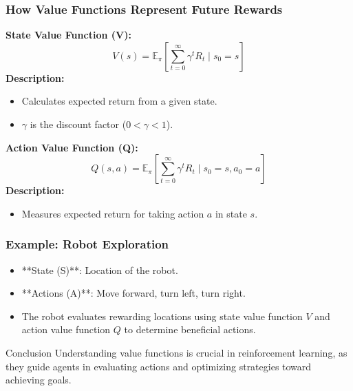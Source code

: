 \documentclass[aspectratio=169]{beamer}
\begin{document}
\begin{frame}[fragile]
    \frametitle{How Value Functions Represent Future Rewards}
    \textbf{State Value Function (V):}
    \begin{equation}
    V(s) = \mathbb{E}_\pi \left[ \sum_{t=0}^{\infty} \gamma^t R_t \mid s_0 = s \right]
    \end{equation}
    \textbf{Description:}
    \begin{itemize}
        \item Calculates expected return from a given state.
        \item \( \gamma \) is the discount factor ($0 < \gamma < 1$).
    \end{itemize}

    \textbf{Action Value Function (Q):}
    \begin{equation}
    Q(s, a) = \mathbb{E}_\pi \left[ \sum_{t=0}^{\infty} \gamma^t R_t \mid s_0 = s, a_0 = a \right]
    \end{equation}
    \textbf{Description:}
    \begin{itemize}
        \item Measures expected return for taking action \( a \) in state \( s \).
    \end{itemize}
\end{frame}

\begin{frame}[fragile]
    \frametitle{Example: Robot Exploration}
    \begin{itemize}
        \item **State (S)**: Location of the robot.
        \item **Actions (A)**: Move forward, turn left, turn right.
        \item The robot evaluates rewarding locations using state value function \( V \) and action value function \( Q \) to determine beneficial actions.
    \end{itemize}
    \begin{block}{Conclusion}
        Understanding value functions is crucial in reinforcement learning, as they guide agents in evaluating actions and optimizing strategies toward achieving goals.
    \end{block}
\end{frame}
\end{document}

